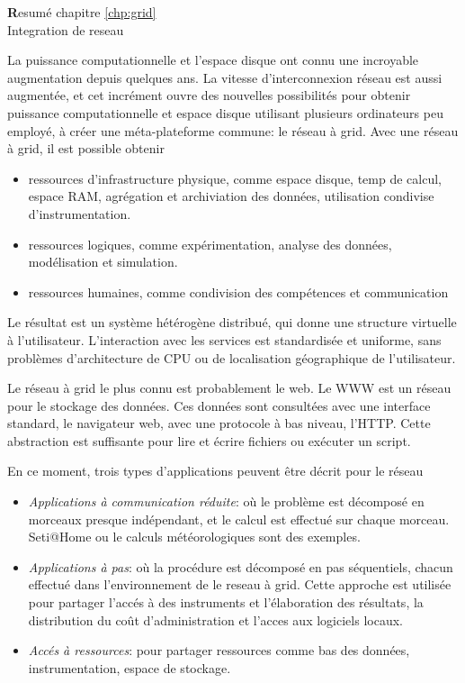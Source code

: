 \pagestyle{empty}
\begin{center}
{\Huge \textbf Resum\'e chapitre \ref{chp:grid} \\ Integration de reseau}
\end{center}

La puissance computationnelle et l'espace disque ont connu une incroyable
augmentation depuis quelques ans. La vitesse d'interconnexion r\'eseau est
aussi augment\'ee, et cet incr\'ement ouvre des nouvelles possibilit\'es pour obtenir
puissance computationnelle et espace disque utilisant plusieurs ordinateurs
peu employ\'e, \`a cr\'eer une m\'eta-plateforme commune: le r\'eseau \`a grid.
Avec une r\'eseau \`a grid, il est possible obtenir
\begin{itemize}
\item ressources d'infrastructure physique, comme espace disque, temp de
calcul, espace RAM, agr\'egation et archiviation des donn\'ees, utilisation
condivise d'instrumentation.
\item ressources logiques, comme exp\'erimentation, analyse des donn\'ees,
mod\'elisation et simulation.
\item ressources humaines, comme condivision des comp\'etences et communication
\end{itemize}

Le r\'esultat est un syst\`eme h\'et\'erog\`ene distribu\'e, qui donne une structure
virtuelle \`a l'utilisateur. L'interaction avec les services est
standardis\'ee et uniforme, sans probl\`emes d'architecture de CPU ou de
localisation g\'eographique de l'utilisateur.

Le r\'eseau \`a grid le plus connu est probablement le web. Le WWW est un
r\'eseau pour le stockage des donn\'ees. Ces donn\'ees sont consult\'ees
avec une interface standard, le navigateur web, avec une protocole \`a bas
niveau, l'HTTP. Cette abstraction est suffisante pour lire et \'ecrire
fichiers ou ex\'ecuter un script.

En ce moment, trois types d'applications peuvent \^etre d\'ecrit pour le
r\'eseau
\begin{itemize}
\item \textit{Applications \`a communication r\'eduite}: o\`u le probl\`eme est
d\'ecompos\'e en morceaux presque ind\'ependant, et le calcul est
effectu\'e sur chaque morceau. Seti@Home\cite{seti-site} ou le calculs
m\'et\'eorologiques sont des exemples.
\item \textit{Applications \`a pas}: o\`u la proc\'edure est d\'ecompos\'e en pas
s\'equentiels, chacun effectu\'e dans l'environnement de le reseau \`a grid.
Cette approche est utilis\'ee pour partager l'acc\'es \`a des instruments et
l'\'elaboration des r\'esultats, la distribution du co\^ut d'administration
et l'acces aux logiciels locaux.
\item \textit{Acc\'es \`a ressources}: pour partager ressources comme
bas des donn\'ees, instrumentation, espace de stockage.
\end{itemize}

